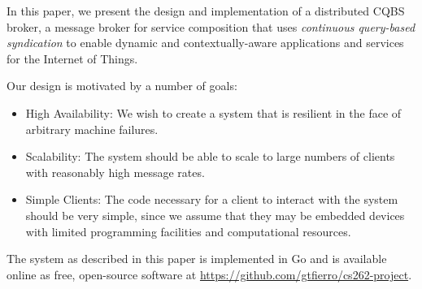 In this paper, we present the design and implementation of a distributed CQBS broker, a message broker for service composition that uses \emph{continuous query-based syndication} to enable dynamic and contextually-aware applications and services for the Internet of Things.

Our design is motivated by a number of goals:
\begin{itemize}
\item High Availability: We wish to create a system that is resilient in the face of arbitrary machine failures.
\item Scalability: The system should be able to scale to large numbers of clients with reasonably high message rates.
\item Simple Clients: The code necessary for a client to interact with the system should be very simple, since we assume that they may be embedded devices with limited programming facilities and computational resources.
\end{itemize}

The system as described in this paper is implemented in Go and is available online as free, open-source software at \url{https://github.com/gtfierro/cs262-project}.

